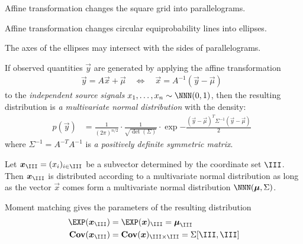 \documentclass[landscape,footrule]{foils}
\newcommand{\COV}{\mathbf{Cov}}
\begin{document}
\begin{triangles}
\item Affine transformation changes the square grid into parallelograms. 
\item Affine transformation changes circular equiprobability lines into ellipses. 
\item The axes of the ellipses may intersect with the sides of parallelograms.
\end{triangles}




If observed quantities $\vec{y}$ are generated by applying the affine transformation 
\begin{align*}
 \vec{y}=A\vec{x}+\vec{\mu}\quad\Leftrightarrow\quad \vec{x}=A^{-1}(\vec{y}-\vec{\mu})\enspace
\end{align*}
to the \emph{independent source signals} $x_1,\ldots, x_n\sim\NNN(0,1)$, then the resulting distribution is \emph{a multivariate normal distribution} with the density:
\begin{align*}
p(\vec{y})&=\frac{1}{(2\pi)^{n/2}}\cdot\frac{1}{\sqrt{\det(\Sigma)}}\cdot
\exp{-\frac{(\vec{y}-\vec{\mu})^T \Sigma^{-1}(\vec{y}-\vec{\mu})}{2}}\enspace
\end{align*} 
where $\Sigma^{-1}=A^{-T}A^{-1}$ is \emph{a positively definite symmetric matrix}.




Let $\vec{x}_{\III}=(x_i)_{i\in\III}$ be a subvector determined by the coordinate set $\III$.
Then $\vec{x}_{\III}$ is distributed according to a multivariate normal distribution as long as 
the vector $\vec{x}$ comes form a multivariate normal distribution $\NNN(\vec{\mu},\Sigma)$.

\begin{triangles}
\item Moment matching gives the parameters of the resulting distribution 
\begin{align*}
\EXP(\vec{x}_{\III})&= \EXP(\vec{x})_{\III}=\vec{\mu}_{\III} \\
\COV(\vec{x}_{\III})&=\COV(\vec{x})_{\III\times \III}=\Sigma[\III, \III]
\end{align*}
\end{triangles}
\end{document}
